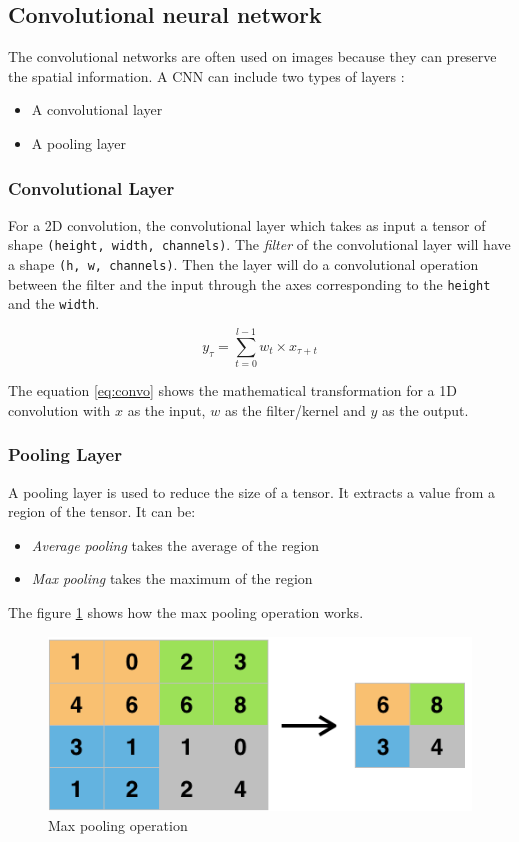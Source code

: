 \documentclass[12pt]{report}
\begin{document}
\subsection{Convolutional neural network}

The convolutional networks are often used on images because they can preserve the spatial information.
A CNN can include two types of layers :
\begin{itemize}
    \item A convolutional layer
    \item A pooling layer
\end{itemize}

\subsubsection{Convolutional Layer}

For a 2D convolution, the convolutional layer which takes as input a tensor of shape \texttt{(height, width, channels)}.
The \textit{filter} of the convolutional layer will have a shape \texttt{(h, w, channels)}.
Then the layer will do a convolutional operation between the filter and the input through the axes corresponding to the \texttt{height} and the \texttt{width}.

\begin{equation}
    y_{\tau} = \sum_{t=0}^{l-1} w_{t} \times x_{\tau + t}
    \label{eq:convo}
\end{equation}

The equation \ref{eq:convo} shows the mathematical transformation for a 1D convolution with $x$ as the input, $w$ as the filter/kernel and $y$ as the output.

\subsubsection{Pooling Layer}

A pooling layer is used to reduce the size of a tensor. It extracts a value from a region of the tensor. It can be:
\begin{itemize}
    \item \textit{Average pooling} takes the average of the region
    \item \textit{Max pooling} takes the maximum of the region
\end{itemize}
The figure \ref{fig:max_pooling} shows how the max pooling operation works.

\begin{figure}[H]
    \centering
    \includegraphics[width=0.75 \textwidth]{images/nn/layers/max_pooling.png}
    \caption{Max pooling operation}
    \label{fig:max_pooling}
\end{figure}
\end{document}
